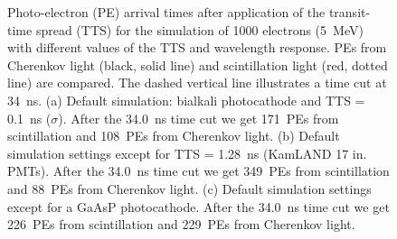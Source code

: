 \documentclass[aps,prc,twocolumn,groupedaddress,showpacs,amsmath,amssymb,floatfix,superscriptaddress]{revtex4}
\begin{document}
\begin{figure}[tbh]
\begin{center}
        \caption[]{Photo-electron (PE) arrival times after application
        of the transit-time spread (TTS) for the simulation
        of 1000 electrons (5~MeV) with different values of the TTS and
        wavelength response. PEs from
        Cherenkov light (black, solid line) and scintillation light
        (red, dotted line) are
        compared. The dashed vertical line illustrates a time cut at
        34~ns. (a) Default simulation: bialkali photocathode and TTS =
        0.1~ns ($\sigma$). After the 34.0~ns time cut we get 171~PEs
        from scintillation and 108~PEs from Cherenkov light. (b)
        Default simulation settings except for TTS = 1.28~ns (KamLAND
        17 in. PMTs). After the 34.0~ns time cut we get 349~PEs from
        scintillation and 88~PEs from Cherenkov light. (c) Default
        simulation settings except for a GaAsP photocathode. After the
        34.0~ns time cut we get 226~PEs from scintillation and 229~PEs
        from Cherenkov light. \label{time_plots_comparison}}
        \end{center}
\end{figure}
\end{document}
